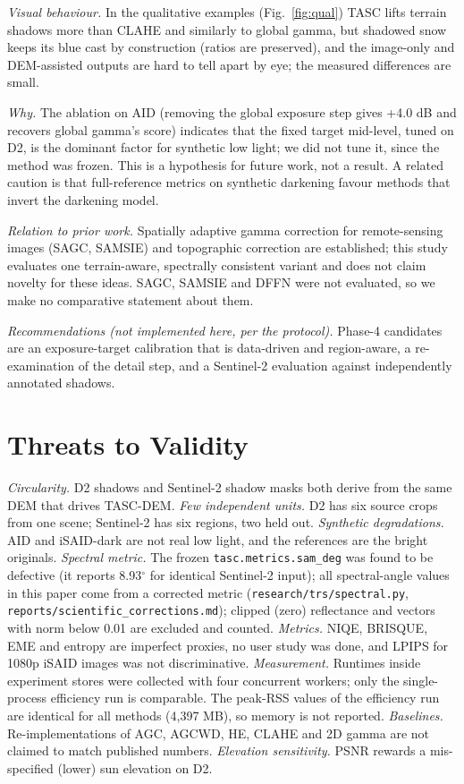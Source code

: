 \documentclass[conference]{IEEEtran}
\begin{document}
\emph{Visual behaviour.} In the qualitative examples (Fig.~\ref{fig:qual}) TASC lifts terrain shadows more than CLAHE and similarly to global gamma, but shadowed snow keeps its blue cast by construction (ratios are preserved), and the image-only and DEM-assisted outputs are hard to tell apart by eye; the measured differences are small.

\emph{Why.} The ablation on AID (removing the global exposure step gives +4.0 dB and recovers global gamma's score) indicates that the fixed target mid-level, tuned on D2, is the dominant factor for synthetic low light; we did not tune it, since the method was frozen. This is a hypothesis for future work, not a result. A related caution is that full-reference metrics on synthetic darkening favour methods that invert the darkening model.

\emph{Relation to prior work.} Spatially adaptive gamma correction for remote-sensing images (SAGC, SAMSIE) and topographic correction are established; this study evaluates one terrain-aware, spectrally consistent variant and does not claim novelty for these ideas. SAGC, SAMSIE and DFFN were not evaluated, so we make no comparative statement about them.

\emph{Recommendations (not implemented here, per the protocol).} Phase-4 candidates are an exposure-target calibration that is data-driven and region-aware, a re-examination of the detail step, and a Sentinel-2 evaluation against independently annotated shadows.

\section{Threats to Validity}
\emph{Circularity.} D2 shadows and Sentinel-2 shadow masks both derive from the same DEM that drives TASC-DEM. \emph{Few independent units.} D2 has six source crops from one scene; Sentinel-2 has six regions, two held out. \emph{Synthetic degradations.} AID and iSAID-dark are not real low light, and the references are the bright originals. \emph{Spectral metric.} The frozen \texttt{tasc.metrics.sam\_deg} was found to be defective (it reports 8.93$^{\circ}$ for identical Sentinel-2 input); all spectral-angle values in this paper come from a corrected metric (\texttt{research/trs/spectral.py}, \texttt{reports/scientific\_corrections.md}); clipped (zero) reflectance and vectors with norm below 0.01 are excluded and counted. \emph{Metrics.} NIQE, BRISQUE, EME and entropy are imperfect proxies, no user study was done, and LPIPS for 1080p iSAID images was not discriminative. \emph{Measurement.} Runtimes inside experiment stores were collected with four concurrent workers; only the single-process efficiency run is comparable. The peak-RSS values of the efficiency run are identical for all methods (4,397 MB), so memory is not reported. \emph{Baselines.} Re-implementations of AGC, AGCWD, HE, CLAHE and 2D gamma are not claimed to match published numbers. \emph{Elevation sensitivity.} PSNR rewards a mis-specified (lower) sun elevation on D2.
\end{document}
